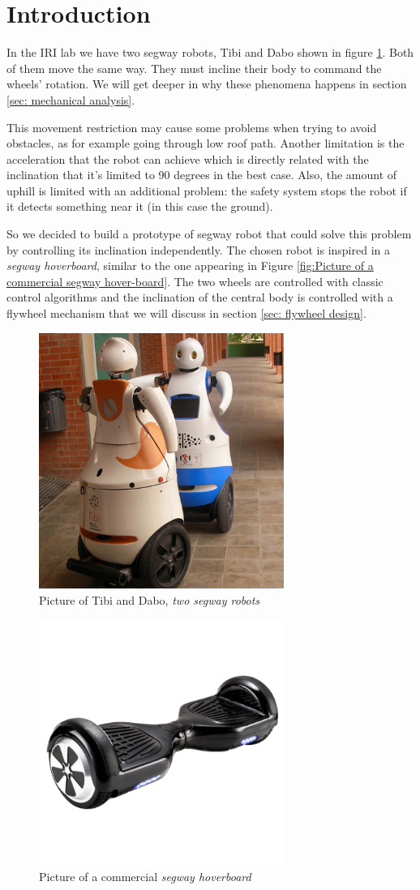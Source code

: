 \section{Introduction}
In the IRI lab we have two segway robots, Tibi and Dabo shown in figure
\ref{fig:Picture of Tibi and Dabo}. Both of them move the same way.
They must incline their body to command the wheels' rotation. We will get deeper
in why these phenomena happens in section \ref{sec: mechanical analysis}.

This movement restriction may cause some problems when trying to avoid obstacles,
as for example going through low roof path. Another limitation is the
acceleration that the robot can achieve which is directly related with the inclination
that it's limited to 90 degrees in the best case. Also, the amount of uphill
is limited with an additional problem: the safety system stops the robot if 
it detects something near it (in this case the ground).

So we decided to build a prototype of segway robot that could solve this problem by 
controlling its inclination independently. The chosen robot is inspired in a
\textit{segway hoverboard}, similar to the one appearing in Figure \ref{fig:Picture of a commercial 
segway hover-board}. The two wheels are controlled with classic control algorithms and the
inclination of the central body is controlled with a flywheel mechanism that we will
discuss in section \ref{sec: flywheel design}.
\begin{figure}
	\centering
	\includegraphics[width=8cm]{img/robots-TIBI-i-DABO-IRI-red.jpg}
	\caption{Picture of Tibi and Dabo, \textit{two segway robots} }
	\label{fig:Picture of Tibi and Dabo}
\end{figure}

\begin{figure}
	\centering
	\includegraphics[width=8cm]{img/segway_hoverboard_picture.png}
	\caption{Picture of a commercial \textit{segway hoverboard} }
	\label{fig:Picture of a commercial segway hover-board}
\end{figure}

